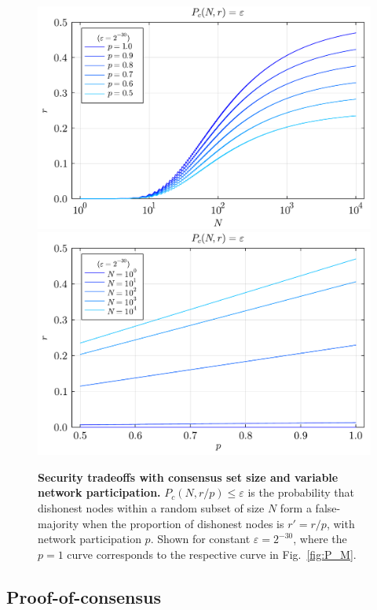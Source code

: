 \begin{figure}
	\includegraphics[width=\columnwidth]{figs/majority_prob_p.pdf}\\
	\includegraphics[width=\columnwidth]{figs/majority_prob_N.pdf}
	\caption{\textbf{Security tradeoffs with consensus set size and variable network participation.} \mbox{$P_c(N,r/p)\leq\varepsilon$} is the probability that dishonest nodes within a random subset of size $N$ form a false-majority when the proportion of dishonest nodes is \mbox{$r'=r/p$}, with network participation $p$. Shown for constant \mbox{$\varepsilon=2^{-30}$}, where the \mbox{$p=1$} curve corresponds to the respective curve in Fig.~\ref{fig:P_M}.}\label{fig:P_M_p}
\end{figure}

\subsection{Proof-of-consensus} \label{sec:PoC}

